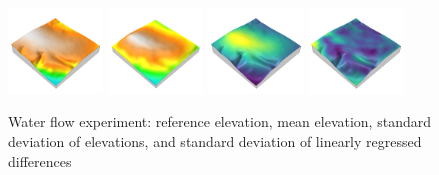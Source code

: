 \documentclass[prodmode,acmtochi]{acmsmall} %
\begin{document}
\begin{figure}[h!]
\begin{center}
		\includegraphics[width=0.225\textwidth]{images/render_3d/dem_4.png}
		\includegraphics[width=0.225\textwidth]{images/render_3d/mean_dem_4.png}
		\includegraphics[width=0.225\textwidth]{images/render_3d/stdev_dem_4.png}
		\includegraphics[width=0.225\textwidth]{images/render_3d/stdev_regression_difference_series_4.png}
	\caption{Water flow experiment: reference elevation, mean elevation, standard deviation of elevations, and standard deviation of linearly regressed differences}
	\label{fig:}
\end{center}
\end{figure}

\end{document}
